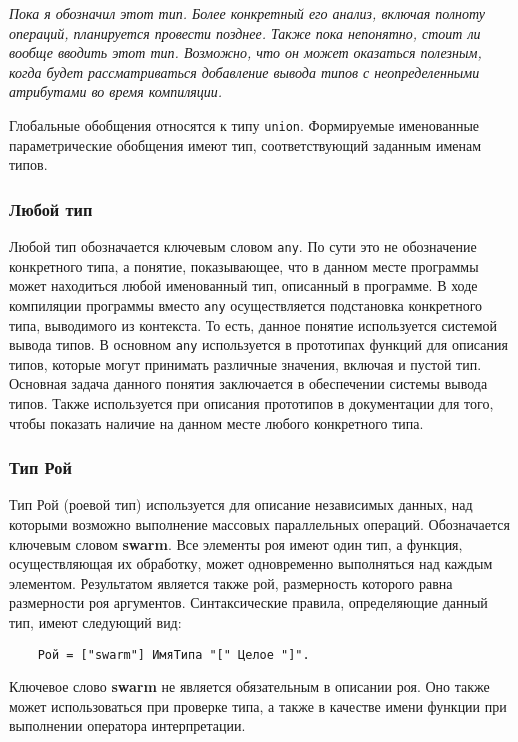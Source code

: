 {\textit{Пока я обозначил этот тип. Более конкретный его анализ, включая полноту операций, планируется провести позднее. Также пока непонятно, стоит ли вообще вводить этот тип. Возможно, что он может оказаться полезным, когда будет рассматриваться добавление вывода типов с неопределенными атрибутами во время компиляции.}

Глобальные обобщения относятся к типу \texttt{union}. Формируемые именованные параметрические обобщения имеют тип, соответствующий заданным именам типов.

\subsubsection{Любой тип}

Любой тип обозначается ключевым словом \texttt{any}. По сути это не обозначение конкретного типа, а понятие, показывающее, что в данном месте программы может находиться любой именованный тип, описанный в программе. В ходе компиляции программы вместо \texttt{any} осуществляется подстановка конкретного типа, выводимого из контекста. То есть, данное понятие используется системой вывода типов. В основном \texttt{any} используется в прототипах функций для описания типов, которые могут принимать различные значения, включая и пустой тип. Основная задача данного понятия заключается в обеспечении системы вывода типов. Также используется при описания прототипов в документации для того, чтобы показать наличие на данном месте любого конкретного типа.

\subsubsection{Тип Рой}

Тип Рой (роевой тип) используется для описание независимых данных, над которыми возможно выполнение массовых параллельных операций. Обозначается ключевым словом \textbf{swarm}. Все элементы роя имеют один тип, а функция, осуществляющая их обработку, может одновременно выполняться над каждым элементом. Результатом является также рой, размерность которого равна размерности роя аргументов. Синтаксические правила, определяющие данный тип, имеют следующий вид:

\begin{verbatim}
    Рой = ["swarm"] ИмяТипа "[" Целое "]".
\end{verbatim}

Ключевое слово \textbf{swarm} не является обязательным в описании роя. Оно также может использоваться при проверке типа, а также в качестве имени функции при выполнении оператора интерпретации.

}
